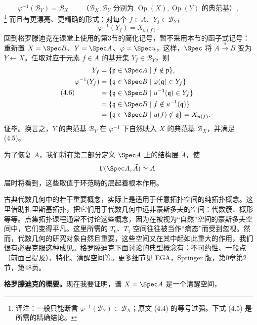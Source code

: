 \begin{equation}\tag{4.4}
\varphi^{-1}(\mathcal B_Y)=\mathcal B_X
\qquad\text{（$\mathcal B_X,\mathcal B_Y$ 分别为 $\operatorname{Op}(X),\operatorname{Op}(Y)$ 的典范基）},
\end{equation}
\footnote{译注：一般只能断言 $\varphi^{-1}(\mathcal B_Y)\subset\mathcal B_X$；原文 (4.4) 的等号过强。下式 (4.5) 是所需的精确结论。}
而且有更漂亮、更精确的形式：对每个 $f\in A$、$Y_f\in\mathcal B_Y$，
\begin{equation}\tag{4.5}
\varphi^{-1}(Y_f)=X_{u(f)}.
\end{equation}
回到格罗滕迪克在课堂上使用的第3节的简化记号，暂不采用本节的函子式记号：重新置 $X=\Spec B$、$Y=\Spec A$、$\varphi=\Spec u$，这样，$\Spec$ 将 $A\xrightarrow{u}B$ 变为 $Y\leftarrow X$。任取对应于元素 $f\in A$ 的基开集 $Y_f\in\mathcal B_Y$，则
\begin{equation}\tag{4.6}
\begin{aligned}
Y_f&=\{\mathfrak p\in\Spec A\mid f\notin\mathfrak p\},\\
\varphi^{-1}(Y_f)
&=\{\mathfrak q\in\Spec B\mid\varphi(\mathfrak q)\in Y_f\}\\
&=\{\mathfrak q\in\Spec B\mid u^{-1}(\mathfrak q)\in Y_f\}\\
&=\{\mathfrak q\in\Spec B\mid f\notin u^{-1}(\mathfrak q)\}\\
&=\{\mathfrak q\in\Spec B\mid u(f)\notin\mathfrak q\}=X_{u(f)}.
\end{aligned}
\end{equation}
证毕。换言之，$Y$ 的典范基 $\mathcal B_Y$ 在 $\varphi^{-1}$ 下自然映入 $X$ 的典范基 $\mathcal B_X$，并满足 (4.5)。

为了恢复 $A$，我们将在第二部分定义 $\Spec A$ 上的结构层 $\widetilde A$，使
\[\Gamma(\Spec A,\widetilde A)\simeq A.\]
届时将看到，这些取值于环范畴的层起着根本作用。

古典代数几何中的若干重要概念，实际上是适用于任意拓扑空间的纯拓扑概念。这里借助扎里斯基拓扑，把它们用于代数几何中远非豪斯多夫的空间：代数簇、概形等等。点集拓扑课程通常不讨论这些概念，因为在被视为“自然”空间的豪斯多夫空间中，它们变得平凡。这里所需的 $T_0$、$T_1$ 空间往往被当作“病态”而受到忽视。然而，代数几何的研究对象自然且重要，这些空间又在其中起如此重大的作用，我们很有必要克服这种成见。格罗滕迪克下面讨论的典型概念有：不可约性、一般点（前面已提及）、特化、清醒空间等。更多细节见 EGA，Springer 版，第0章第2节，第48页。

\textbf{格罗滕迪克的概要。}现在我要证明，谱 $X=\Spec A$ 是一个清醒空间，


